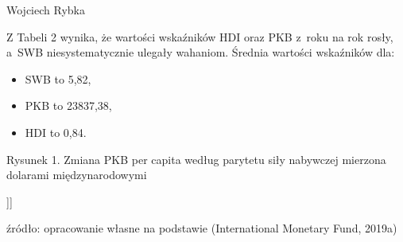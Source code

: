 \begin{artplenv}{Wojciech Rybka}
%
%

Z Tabeli 2 wynika, że wartości wskaźników HDI oraz PKB z~roku na rok rosły, a~SWB niesystematycznie ulegały wahaniom.
Średnia wartości wskaźników dla:

\begin{itemize}
\item SWB to 5,82, 
\item PKB to 23837,38, 
\item HDI to 0,84.
\end{itemize}
{\centering
Rysunek 1. Zmiana PKB per capita według parytetu siły nabywczej mierzona dolarami międzynarodowymi%

\par}

{\centering
[[[rysunek\_1]]]
\par}

źródło: opracowanie własne na podstawie \label{ref:RNDl3ypL6FseV}(International Monetary Fund, 2019a)


\end{artplenv}
